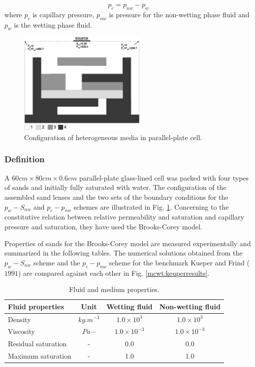 \begin{equation}
p_c=p_{nw}-p_w
\label{eq:mcwtFluxEq}
\end{equation}                                                 
where $p_c$ is capillary pressure, $p_{nw}$ is pressure for the non-wetting phase fluid and $p_w$ is the wetting phase fluid. 

\begin{figure}[!tbh]
\begin{center}
\includegraphics[height=5cm]{chapter_13/figures/fig_13_1_12}
\end{center}
\caption{Configuration of heterogeneous media in parallel-plate cell.}
\label{mcwt:keuperconfig}
\end{figure}

\subsubsection*{Definition}
A $60cm\times80cm\times0.6cm$ parallel-plate glass-lined cell was packed with four types of sands and initially fully saturated with water. The configuration of the assembled sand lenses and the two sets of the boundary conditions for the $p_w-S_{nw}$ and $p_c-p_{nw}$ schemes are illustrated in Fig. \ref{mcwt:keuperconfig}. Concerning to the constitutive relation between relative permeability and saturation and capillary pressure and saturation, they have used the Brooks-Corey model. 

Properties of sands for the Brooks-Corey model are measured experimentally and summarized in the following tables. The numerical solutions obtained from the $p_w-S_{nw}$ scheme and the $p_c-p_{nw}$ scheme for the benchmark Kueper and Frind ($1991$) are compared against each other in Fig. \ref{mcwt:keuperresults}. 

\begin{table}[!htb]
\begin{center}
\begin{tabular}{lccc}
\hline
Fluid properties & Unit & Wetting fluid	& Non-wetting fluid \\
\hline
Density &	$kg.m^{-3}$ &	$1.0\times10^3$ &	$1.0\times10^3$ \\ 
Viscosity &	$Pa\cdots$ & $1.0\times10^{-3}$ &	$1.0\times10^{-3}$ \\
Residual saturation &	- &	0.0 &	0.0 \\
Maximum saturation &	- &	1.0 &	1.0 \\
\hline
\end{tabular}
\caption{Fluid and medium properties.}
\end{center}
\end{table}

